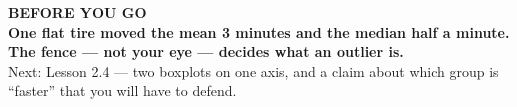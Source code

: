 \documentclass[aspectratio=169, 11pt]{beamer}
\begin{document}
{
\begin{frame}[plain]
  \vspace{1.5cm}\hspace{0.8cm}%
  \begin{minipage}{0.86\textwidth}
    {\color{goldacc}\bfseries\small BEFORE YOU GO}\\[0.7cm]
    {\color{white}\bfseries\Large One flat tire moved the mean 3 minutes and the median half a
    minute. The fence --- not your eye --- decides what an outlier is.}\\[0.9cm]
    {\color{frostmid}\small Next: Lesson 2.4 --- two boxplots on one axis, and a claim about
    which group is ``faster'' that you will have to defend.}
  \end{minipage}
\end{frame}
}
\end{document}
